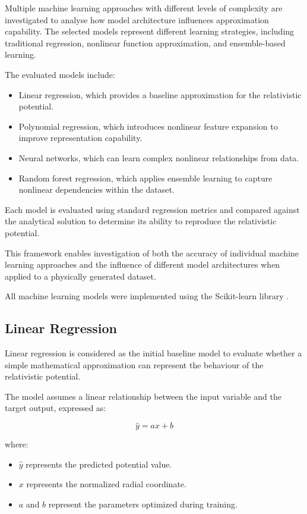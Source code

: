 \documentclass[
]{article}
\providecommand{\tightlist}{
  \setlength{\itemsep}{0pt}\setlength{\parskip}{0pt}}
\begin{document}
Multiple machine learning approaches with different levels of complexity
are investigated to analyse how model architecture influences
approximation capability. The selected models represent different
learning strategies, including traditional regression, nonlinear
function approximation, and ensemble-based learning.

The evaluated models include:

\begin{itemize}
\tightlist
\item
  Linear regression, which provides a baseline approximation for the
  relativistic potential.
\item
  Polynomial regression, which introduces nonlinear feature expansion to
  improve representation capability.
\item
  Neural networks, which can learn complex nonlinear relationships from
  data.
\item
  Random forest regression, which applies ensemble learning to capture
  nonlinear dependencies within the dataset.
\end{itemize}

Each model is evaluated using standard regression metrics and compared
against the analytical solution to determine its ability to reproduce
the relativistic potential.

This framework enables investigation of both the accuracy of individual
machine learning approaches and the influence of different model
architectures when applied to a physically generated dataset.

All machine learning models were implemented using the Scikit-learn
library \cite{pedregosa2011}.

\subsection{Linear Regression}\label{linear-regression}

Linear regression is considered as the initial baseline model to
evaluate whether a simple mathematical approximation can represent the
behaviour of the relativistic potential.

The model assumes a linear relationship between the input variable and
the target output, expressed as:

\[
\hat{y}=a x+b
\]

where:

\begin{itemize}
\item $\hat{y}$ represents the predicted potential value.
\item $x$ represents the normalized radial coordinate.
\item $a$ and $b$ represent the parameters optimized during training.
\end{itemize}
\end{document}
